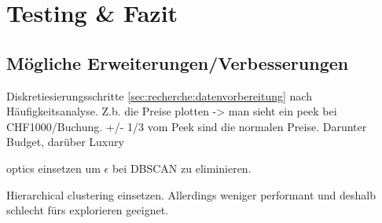 
\chapter{Testing \& Fazit}
\label{sec:testingfazit}

\section{Mögliche Erweiterungen/Verbesserungen}
Diskretiesierungsschritte \cref{sec:recherche:datenvorbereitung} nach Häufigkeitsanalyse.
Z.b. die Preise plotten -> man sieht ein peek bei CHF1000/Buchung. +/- 1/3 vom Peek sind die normalen Preise. Darunter Budget, darüber Luxury

\gls{optics} einsetzen um $\epsilon$ bei \gls{DBSCAN} zu eliminieren.

Hierarchical clustering einsetzen. Allerdings weniger performant und deshalb schlecht fürs explorieren geeignet.
